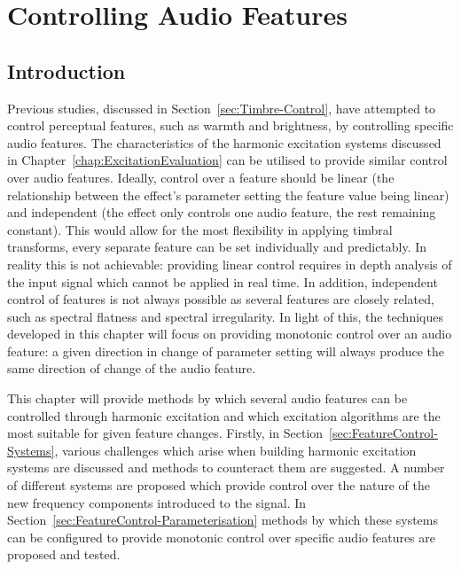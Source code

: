 
\chapter{Controlling Audio Features} %
\label{chap:FeatureControl}

\section{Introduction}
\label{sec:FeatureControl-Introduction}
	Previous studies, discussed in Section~\ref{sec:Timbre-Control}, have attempted to control perceptual features,
	such as warmth and brightness, by controlling specific audio features. The characteristics of the harmonic
	excitation systems discussed in Chapter~\ref{chap:ExcitationEvaluation} can be utilised to provide similar control
	over audio features. Ideally, control over a feature should be linear (the relationship between the effect's
	parameter setting the feature value being linear) and independent (the effect only controls one audio feature, the
	rest remaining constant). This would allow for the most flexibility in applying timbral transforms, every separate
	feature can be set individually and predictably. In reality this is not achievable: providing linear control
	requires in depth analysis of the input signal which cannot be applied in real time. In addition, independent
	control of features is not always possible as several features are closely related, such as spectral flatness and
	spectral irregularity. In light of this, the techniques developed in this chapter will focus on providing monotonic
	control over an audio feature: a given direction in change of parameter setting will always produce the same
	direction of change of the audio feature.
	
	This chapter will provide methods by which several audio features can be controlled through harmonic excitation and
	which excitation algorithms are the most suitable for given feature changes. Firstly, in
	Section~\ref{sec:FeatureControl-Systems}, various challenges which arise when building harmonic excitation systems
	are discussed and methods to counteract them are suggested. A number of different systems are proposed which
	provide control over the nature of the new frequency components introduced to the signal. In
	Section~\ref{sec:FeatureControl-Parameterisation} methods by which these systems can be configured to provide
	monotonic control over specific audio features are proposed and tested.

